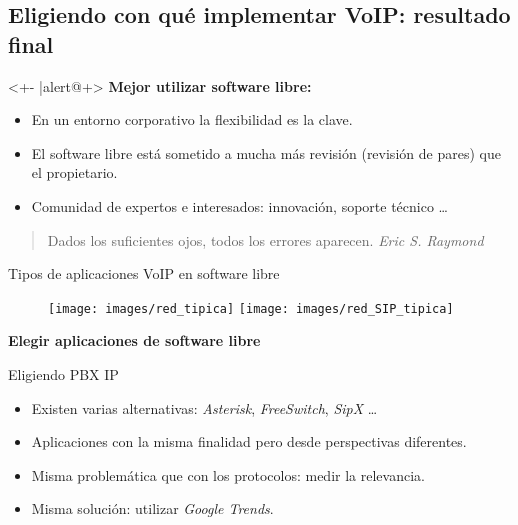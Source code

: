 \documentclass{beamer}
\begin{document}
\subsection{Eligiendo con qué implementar VoIP: resultado final}

\begin{frame}
  \begin{block}<+- |alert@+> {\textbf{Mejor utilizar software libre:}}
    \begin{itemize}
    \item En un entorno corporativo la flexibilidad es la clave.
    \item El software libre está sometido a mucha más revisión (revisión de pares) que el propietario.
    \item Comunidad de expertos e interesados: innovación, soporte técnico \ldots
    \end{itemize}   
     
    \begin{quotation}
      Dados los suficientes ojos, todos los errores aparecen. \emph{Eric S. Raymond}
    \end{quotation}
  \end{block}
\end{frame}

\begin{frame}{Tipos de aplicaciones VoIP en software libre}
  \begin{figure}
    \centering
    \parbox{0.8\textwidth}{
      \begin{multicols}{2}
        \texttt{[image: images/red\_tipica]}
        \texttt{[image: images/red\_SIP\_tipica]}  
      \end{multicols}
    }
  \end{figure}
\end{frame}

\begin{frame}
  \begin{center}
    \huge{\textbf{Elegir aplicaciones de software libre}}
  \end{center}
\end{frame}

\begin{frame}
  \begin{block}{Eligiendo PBX IP}
    \begin{itemize}
    \item Existen varias alternativas: \emph{Asterisk}, \emph{FreeSwitch}, \emph{SipX} \ldots
    \item Aplicaciones con la misma finalidad pero desde perspectivas diferentes.
    \item Misma problemática que con los protocolos: medir la relevancia.
    \item Misma solución: utilizar \emph{Google Trends}.
    \end{itemize}
  \end{block}
\end{frame}
\end{document}
